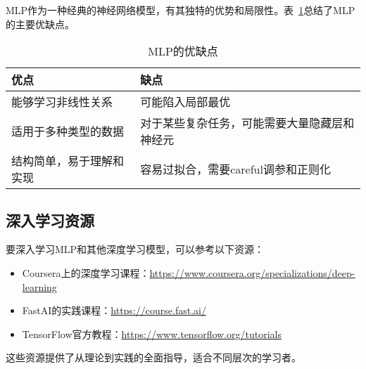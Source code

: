 MLP作为一种经典的神经网络模型，有其独特的优势和局限性\cite{LeCun2015}。表~\ref{tab:mlp_pros_cons}总结了MLP的主要优缺点。

\begin{table}
    \centering
    \begin{tabular}{p{}p{}}
    \toprule
    优点 & 缺点 \\
    \midrule
    能够学习非线性关系 & 可能陷入局部最优 \\
    适用于多种类型的数据 & 对于某些复杂任务，可能需要大量隐藏层和神经元 \\
    结构简单，易于理解和实现 & 容易过拟合，需要careful调参和正则化 \\
    \bottomrule
    \end{tabular}
    \caption{MLP的优缺点}
    \label{tab:mlp_pros_cons}
\end{table}

\subsection{深入学习资源}

要深入学习MLP和其他深度学习模型，可以参考以下资源：

\begin{itemize}
    \item Coursera上的深度学习课程：\url{https://www.coursera.org/specializations/deep-learning}
    \item FastAI的实践课程：\url{https://course.fast.ai/}
    \item TensorFlow官方教程：\url{https://www.tensorflow.org/tutorials}
\end{itemize}

这些资源提供了从理论到实践的全面指导，适合不同层次的学习者。
